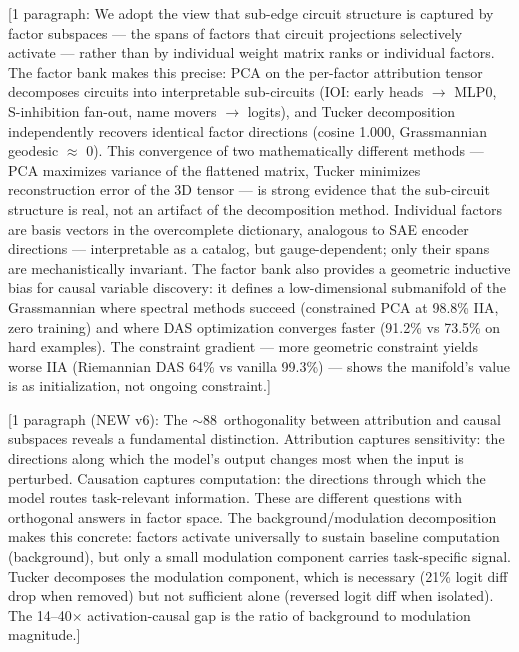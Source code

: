 \documentclass[11pt]{article}
\begin{document}
[1 paragraph: We adopt the view that sub-edge circuit structure is captured
by factor subspaces --- the spans of factors that circuit projections
selectively activate --- rather than by individual weight matrix ranks or
individual factors. The factor bank makes this precise: PCA on the
per-factor attribution tensor decomposes circuits into interpretable
sub-circuits (IOI: early heads $\to$ MLP0, S-inhibition fan-out, name
movers $\to$ logits), and Tucker decomposition independently recovers
identical factor directions (cosine 1.000, Grassmannian geodesic
$\approx$ 0). This convergence of two mathematically different methods
--- PCA maximizes variance of the flattened matrix, Tucker minimizes
reconstruction error of the 3D tensor --- is strong evidence that the
sub-circuit structure is real, not an artifact of the decomposition
method. Individual factors are basis vectors in the overcomplete
dictionary, analogous to SAE encoder directions --- interpretable as a
catalog, but gauge-dependent; only their spans are mechanistically
invariant. The factor bank also provides a geometric inductive bias for
causal variable discovery: it defines a low-dimensional submanifold of
the Grassmannian where spectral methods succeed (constrained PCA at
98.8\% IIA, zero training) and where DAS optimization converges faster
(91.2\% vs 73.5\% on hard examples). The constraint gradient --- more
geometric constraint yields worse IIA (Riemannian DAS 64\% vs vanilla
99.3\%) --- shows the manifold's value is as initialization, not
ongoing constraint.]


[1 paragraph (NEW v6): The $\sim$88\textdegree\ orthogonality between
attribution and causal subspaces reveals a fundamental distinction.
Attribution captures sensitivity: the directions along which the model's
output changes most when the input is perturbed. Causation captures
computation: the directions through which the model routes task-relevant
information. These are different questions with orthogonal answers in
factor space. The background/modulation decomposition makes this concrete:
factors activate universally to sustain baseline computation (background),
but only a small modulation component carries task-specific signal. Tucker
decomposes the modulation component, which is necessary (21\% logit diff
drop when removed) but not sufficient alone (reversed logit diff when
isolated). The 14--40$\times$ activation-causal gap is the ratio of
background to modulation magnitude.]
\end{document}
